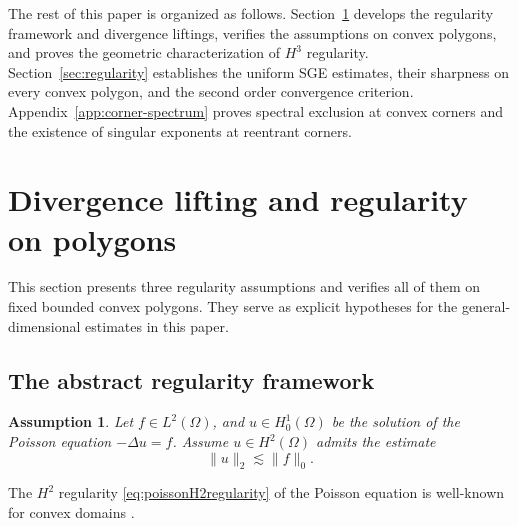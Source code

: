 \documentclass[10pt]{amsart}
\newtheorem{assumption}[theorem]{Assumption}
\numberwithin{equation}{section}
\begin{document}


The rest of this paper is organized as follows. Section~\ref{sec:assumption} develops the regularity framework and divergence liftings, verifies the assumptions on convex polygons, and proves the geometric characterization of $H^3$ regularity. Section~\ref{sec:regularity} establishes the uniform SGE estimates, their sharpness on every convex polygon, and the second order convergence criterion. Appendix~\ref{app:corner-spectrum} proves spectral exclusion at convex corners and the existence of singular exponents at reentrant corners.


\section{Divergence lifting and regularity on polygons}\label{sec:assumption}

This section presents three regularity assumptions and verifies all of them on fixed bounded convex polygons. They serve as explicit hypotheses for the general-dimensional estimates in this paper.

\subsection{The abstract regularity framework}
\begin{assumption}\label{RegularityAssumption0}
Let $f \in L^2(\Omega)$, and $u\in H_0^1(\Omega)$ be the solution of the Poisson equation $-\Delta u=f$. Assume $u\in H^2(\Omega)$ admits the estimate
\begin{equation}\label{eq:poissonH2regularity}
\|u\|_2\lesssim \|f\|_{0}.
\end{equation}
\end{assumption}
The $H^2$ regularity \eqref{eq:poissonH2regularity} of the Poisson equation is well-known for convex domains \cite[Theorem 3.2.1.2]{Grisvard1985}.
\end{document}

